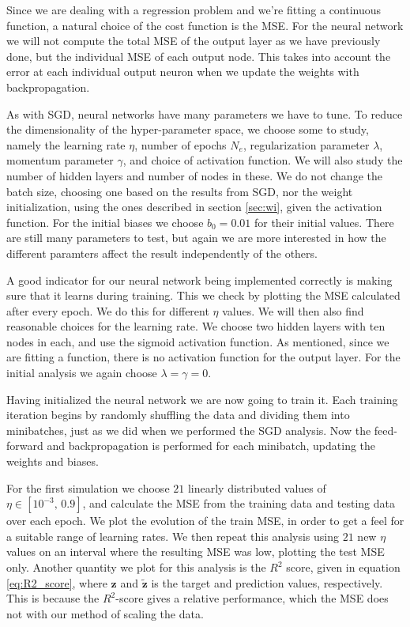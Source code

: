 \documentclass[12pt]{extarticle}
\begin{document}
Since we are dealing with a regression problem and we're fitting a continuous function, a natural choice of the cost function is the MSE. For the neural network we will not compute the total MSE of the output layer as we have previously done, but the individual MSE of each output node. This takes into account the error at each individual output neuron when we update the weights with backpropagation.

As with SGD, neural networks have many parameters we have to tune. To reduce the dimensionality of the hyper-parameter space, we choose some to study, namely the learning rate $\eta$, number of epochs $N_e$, regularization parameter $\lambda$, momentum parameter $\gamma$, and choice of activation function. We will also study the number of hidden layers and number of nodes in these. We do not change the batch size, choosing one based on the results from SGD, nor the weight initialization, using the ones described in section \ref{sec:wi}, given the activation function. For the initial biases we choose $b_0=0.01$ for their initial values. There are still many parameters to test, but again we are more interested in how the different paramters affect the result independently of the others.

A good indicator for our neural network being implemented correctly is making sure that it learns during training. This we check by plotting the MSE calculated after every epoch. We do this for different $\eta$ values. We will then also find reasonable choices for the learning rate. We choose two hidden layers with ten nodes in each, and use the sigmoid activation function. As mentioned, since we are fitting a function, there is no activation function for the output layer. For the initial analysis we again choose $\lambda=\gamma=0$.

Having initialized the neural network we are now going to train it. Each training iteration begins by randomly shuffling the data and dividing them into minibatches, just as we did when we performed the SGD analysis. Now the feed-forward and backpropagation is performed for each minibatch, updating the weights and biases.

For the first simulation we choose $21$ linearly distributed values of $\eta\in[10^{-3},\,0.9]$, and calculate the MSE from the training data and testing data over each epoch. We plot the evolution of the train MSE, in order to get a feel for a suitable range of learning rates. We then repeat this analysis using $21$ new $\eta$ values on an interval where the resulting MSE was low, plotting the test MSE only. Another quantity we plot for this analysis is the $R^2$ score, given in equation \eqref{eq:R2_score}, where $\boldsymbol{z}$ and $\boldsymbol{\tilde{z}}$ is the target and prediction values, respectively. This is because the $R^2$-score gives a relative performance, which the MSE does not with our method of scaling the data.
\end{document}
